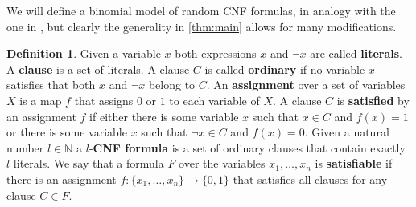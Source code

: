\documentclass[12pt,notitlepage,a4paper]{article}
\theoremstyle{definition}
\newtheorem{definition}{Definition}[section]
\newcommand{\N}{\mathbb{N}}
\begin{document}
We will define a binomial model of random CNF formulas, 
in analogy with the one in \cite{chvatal1992mick},
but clearly the generality
in \cref{thm:main} allows for many modifications. \par

\begin{definition}
Given a variable $x$ both expressions
$x$ and $\neg x$ are called \textbf{literals}. A \textbf{clause}
is a set of literals. A clause $C$ is called \textbf{ordinary}
if no variable $x$ satisfies that both $x$ and $\neg x$
belong to $C$. An \textbf{assignment} over a set of variables $X$ is a 
map $f$ that assigns $0$ or $1$ to each variable of $X$. A clause $C$
is \textbf{satisfied} by an assignment $f$ if either there is some variable $x$
such that $x\in C$ and $f(x)=1$ or there is some variable $x$ such that
$\neg x\in C$ and $f(x)=0$. 
Given a natural number $l\in\N$
a $l$-\textbf{CNF formula} is a set of  ordinary clauses 
that contain exactly $l$ literals. 
We say that a formula $F$
over the variables $x_1,\dots, x_n$ is \textbf{satisfiable} if there is an
assignment $f:\{x_1,\dots, x_n\}\rightarrow \{0,1\}$ that satisfies all clauses
for any clause $C\in F$. 
\end{definition}
\end{document}
